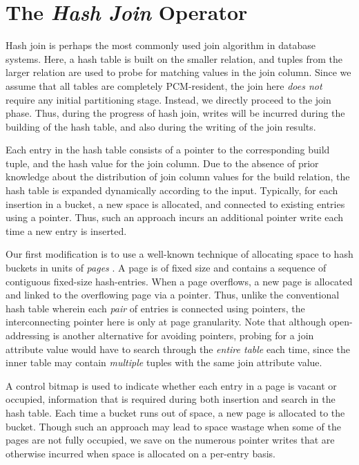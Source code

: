 \section{The \emph{Hash Join} Operator}
\label{hj}
Hash join is perhaps the most commonly used join algorithm in database
systems. Here, a hash table is built on the smaller relation, and tuples
from the larger relation are used to probe for matching values in the join
column. Since we assume that all tables are completely PCM-resident, the
join here \emph{does not} require any initial partitioning stage. Instead,
we directly proceed to the join phase. Thus, during the progress of hash join, writes will be incurred during the building of the hash table,
and also during the writing of the join results.

Each entry in the hash table consists of a pointer to the corresponding
build tuple, and the hash value for the join column. Due to the
absence of prior knowledge about the distribution of join column values
for the build relation, the hash table is expanded dynamically according
to the input. Typically, for each insertion in a bucket, a new space is
allocated, and connected to existing entries using a pointer. Thus,
such an approach incurs an additional pointer write each time a new
entry is inserted.

Our first modification is to use a well-known technique of allocating
space to hash buckets in units of \textit{pages} \cite{paging}. A
page is of fixed size and contains a sequence of contiguous fixed-size
hash-entries.  When a page overflows, a new page is allocated and linked to
the overflowing page via a pointer.  Thus, unlike the conventional hash
table wherein each \emph{pair} of entries is connected using pointers,
the interconnecting pointer here is only at page granularity. Note that
although open-addressing is another alternative for avoiding pointers,
probing for a join attribute value would have to search through the
\emph{entire table} each time, since the inner table may contain
\emph{multiple} tuples with the same join attribute value.

A control bitmap is used to indicate whether each entry in a page is vacant
or occupied, information that is required during both insertion and search in the
hash table. Each time a bucket runs out of space, a new page is allocated
to the bucket. Though such an approach may lead to space wastage when
some of the pages are not fully occupied, we save on the numerous pointer
writes that are otherwise incurred when space is allocated on a per-entry basis.

